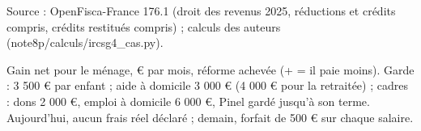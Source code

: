 Source : OpenFisca-France 176.1 (droit des revenus 2025, réductions et crédits compris, crédits restitués compris) ; calculs des auteurs (note8p/calculs/ircsg4\_cas.py).\par Gain net pour le ménage, € par mois, réforme achevée (+ = il paie moins). Garde : 3 500 € par enfant ; aide à domicile 3 000 € (4 000 € pour la retraitée) ; cadres : dons 2 000 €, emploi à domicile 6 000 €, Pinel gardé jusqu'à son terme. Aujourd'hui, aucun frais réel déclaré ; demain, forfait de 500 € sur chaque salaire.
